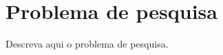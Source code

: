 \section{Problema de pesquisa}
\label{sec:problema-pesquisa}


Descreva aqui o problema de pesquisa.
